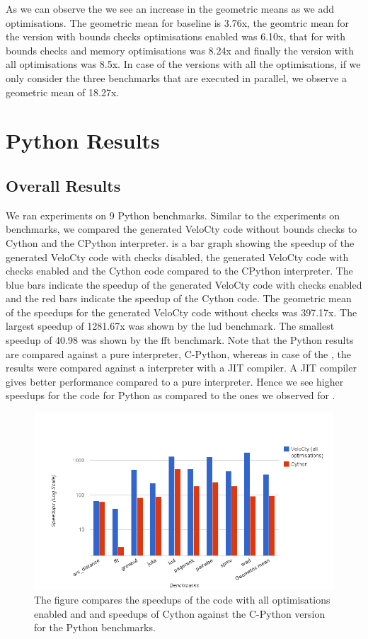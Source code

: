 As we can observe the we see an increase in the geometric means as we add optimisations. The geometric mean for baseline \velocty is 3.76x, the geomtric mean for the \velocty version with bounds checks optimisations enabled was 6.10x, that for \velocty with bounds checks and memory optimisations was 8.24x and finally the version with all optimisations was 8.5x. In case of the \velocty versions with all the optimisations, if we only consider the three benchmarks that are executed in parallel, we observe a geometric mean of 18.27x.

\section{Python Results}
\subsection{Overall Results}
We ran experiments on 9 Python benchmarks. Similar to the experiments on \matlab benchmarks, we compared the generated VeloCty code without bounds checks to Cython and the CPython interpreter.  is a bar graph showing the speedup of the generated VeloCty code with checks disabled, the generated VeloCty code with checks enabled and the Cython code compared to the CPython interpreter. The blue bars indicate the speedup of the generated VeloCty code with checks enabled and the red bars indicate the speedup of the Cython code. The geometric mean of the speedups for the generated VeloCty code without checks was 397.17x. The largest speedup of 1281.67x was shown by the \textsf{lud} benchmark. The smallest speedup of 40.98 was shown by the \textsf{fft} benchmark. Note that the Python results are compared against a pure interpreter, C-Python, whereas in case of the \matlab, the results were compared against a interpreter with a JIT compiler. A JIT compiler gives better performance compared to a pure interpreter. Hence we see higher speedups for the \velocty code for Python as compared to the ones we observed for \matlab. 
\begin{figure}[htbp]
\centering
\includegraphics[scale=0.5]{Figures/results_cwochecks_py.png}
\caption[Overall results for Python Benchmarks]{The figure compares the speedups of the \velocty code with all optimisations enabled and and speedups of Cython against the C-Python version for the Python benchmarks.}
\label{fig:results_cwochecks_py}
\end{figure}


